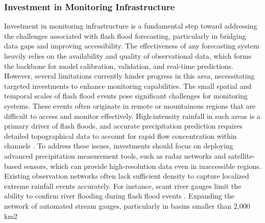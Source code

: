 \subsubsection{Investment in Monitoring Infrastructure}
Investment in monitoring infrastructure is a fundamental step toward addressing the challenges associated with flash flood forecasting, particularly in bridging data gaps and improving accessibility. The effectiveness of any forecasting system heavily relies on the availability and quality of observational data, which forms the backbone for model calibration, validation, and real-time predictions. However, several limitations currently hinder progress in this area, necessitating targeted investments to enhance monitoring capabilities. The small spatial and temporal scales of flash flood events pose significant challenges for monitoring systems. These events often originate in remote or mountainous regions that are difficult to access and monitor effectively. High-intensity rainfall in such areas is a primary driver of flash floods, and accurate precipitation prediction requires detailed topographical data to account for rapid flow concentration within channels \citep{Kuksina2020}. To address these issues, investments should focus on deploying advanced precipitation measurement tools, such as radar networks and satellite-based sensors, which can provide high-resolution data even in inaccessible regions. Existing observation networks often lack sufficient density to capture localized extreme rainfall events accurately. For instance, scant river gauges limit the ability to confirm river flooding during flash flood events \citep{Henderson2020}. Expanding the network of automated stream gauges, particularly in basins smaller than 2,000 km2
